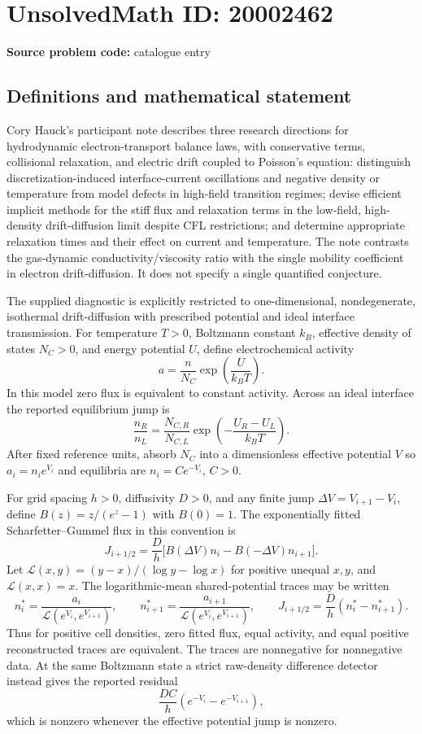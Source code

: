 \documentclass[11pt]{article}
\begin{document}
\section*{UnsolvedMath ID: 20002462}
\textbf{Source problem code:} catalogue entry
\subsection{Definitions and mathematical statement}
Cory Hauck's participant note describes three research directions for hydrodynamic electron-transport balance laws, with conservative terms, collisional relaxation, and electric drift coupled to Poisson's equation: distinguish discretization-induced interface-current oscillations and negative density or temperature from model defects in high-field transition regimes; devise efficient implicit methods for the stiff flux and relaxation terms in the low-field, high-density drift-diffusion limit despite CFL restrictions; and determine appropriate relaxation times and their effect on current and temperature. The note contrasts the gas-dynamic conductivity/viscosity ratio with the single mobility coefficient in electron drift-diffusion. It does not specify a single quantified conjecture.

The supplied diagnostic is explicitly restricted to one-dimensional, nondegenerate, isothermal drift-diffusion with prescribed potential and ideal interface transmission. For temperature $T>0$, Boltzmann constant $k_B$, effective density of states $N_C>0$, and energy potential $U$, define electrochemical activity
\[
 a=\frac{n}{N_C}\exp\!\left(\frac{U}{k_BT}\right).
\]
In this model zero flux is equivalent to constant activity. Across an ideal interface the reported equilibrium jump is
\[
 \frac{n_R}{n_L}=\frac{N_{C,R}}{N_{C,L}}
 \exp\!\left(-\frac{U_R-U_L}{k_BT}\right).
\]
After fixed reference units, absorb $N_C$ into a dimensionless effective potential $V$ so $a_i=n_i e^{V_i}$ and equilibria are $n_i=C e^{-V_i}$, $C>0$.

For grid spacing $h>0$, diffusivity $D>0$, and any finite jump $\Delta V=V_{i+1}-V_i$, define $B(z)=z/(e^z-1)$ with $B(0)=1$. The exponentially fitted Scharfetter--Gummel flux in this convention is
\[
 J_{i+1/2}=\frac D h\bigl[B(\Delta V)n_i-B(-\Delta V)n_{i+1}\bigr].
\]
Let $\mathcal L(x,y)=(y-x)/(\log y-\log x)$ for positive unequal $x,y$, and $\mathcal L(x,x)=x$. The logarithmic-mean shared-potential traces may be written
\[
 n_i^*=\frac{a_i}{\mathcal L(e^{V_i},e^{V_{i+1}})},\qquad
 n_{i+1}^*=\frac{a_{i+1}}{\mathcal L(e^{V_i},e^{V_{i+1}})},\qquad
 J_{i+1/2}=\frac D h(n_i^*-n_{i+1}^*).
\]
Thus for positive cell densities, zero fitted flux, equal activity, and equal positive reconstructed traces are equivalent. The traces are nonnegative for nonnegative data. At the same Boltzmann state a strict raw-density difference detector instead gives the reported residual
\[
 \frac{DC}{h}(e^{-V_i}-e^{-V_{i+1}}),
\]
which is nonzero whenever the effective potential jump is nonzero.
\end{document}
